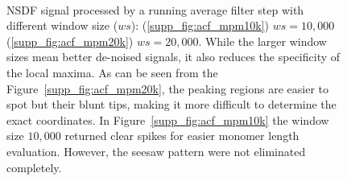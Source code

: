 \begin{figure}[!hpt]
\centering
{}
\\
\caption[NSDF signal processed after running average filter method with different window size]{NSDF signal processed by a running average filter step with different window size ($ws$): (\ref{supp_fig:acf_mpm10k}) $ws=10,000$ (\ref{supp_fig:acf_mpm20k}) $ws=20,000$. While the larger window sizes mean better de-noised signals, it also reduces the specificity of the local maxima. 
As can be seen from the Figure~\ref{supp_fig:acf_mpm20k}, the peaking regions are easier to spot but their blunt tips, making it more difficult to determine the exact coordinates. In Figure~\ref{supp_fig:acf_mpm10k} the window size $10,000$ returned clear spikes for easier monomer length evaluation. However, the seesaw pattern were not eliminated completely.}
\label{supp_fig:concat_acf_raw}
\end{figure}

